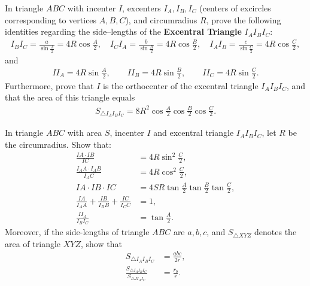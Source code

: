     \begin{question}[name={Excentral Triangle Side--Lengths}]
        In triangle $ABC$ with incenter $I$, excenters $I_A, I_B, I_C$ (centers of excircles corresponding to vertices $A,B,C$), and circumradius $R$, prove the following identities regarding the side--lengths of the \textbf{Excentral Triangle} $I_AI_BI_C$:
        \begin{align*}
            I_BI_C = \frac{a}{\displaystyle\sin\frac{A}{2}}=4R\cos\frac{A}{2}, \quad I_CI_A = \frac{b}{\displaystyle\sin\frac{B}{2}}=4R\cos\frac{B}{2}, \quad
            I_AI_B = \frac{c}{\displaystyle\sin\frac{C}{2}}=4R\cos\frac{C}{2},
        \end{align*}
        and
        \begin{align*}
            II_A = 4R\sin\frac{A}{2}, \qquad II_B = 4R\sin\frac{B}{2}, \qquad II_C = 4R\sin\frac{C}{2}.
        \end{align*}
        Furthermore, prove that $I$ is the orthocenter of the excentral triangle $I_AI_BI_C$, and that the area of this triangle equals
        \begin{align*}
            S_{\triangle I_AI_BI_C} = 8R^2\cos\frac{A}{2}\cos\frac{B}{2}\cos\frac{C}{2}.
        \end{align*}
    \end{question}


    \begin{question}[name={Excentral Identities}]
        In triangle $ABC$ with area $S$, incenter $I$ and excentral triangle $I_AI_BI_C$, let $R$ be the circumradius. Show that:
        \begin{align*}
            \frac{IA\cdot IB}{IC} &= 4R\sin^2\frac{C}{2},\\
            \frac{I_AA\cdot I_AB}{I_AC} &= 4R\cos^2\frac{C}{2},\\     IA \cdot IB \cdot IC &= 4SR\tan\frac{A}{2}\tan\frac{B}{2}\tan\frac{C}{2},\\
            \frac{IA}{I_AA}+\frac{IB}{I_BB}+\frac{IC}{I_CC}& = 1,\\
            \frac{II_A}{I_BI_C} &= \tan \frac{A}{2}.
        \end{align*}
        Moreover, if the side-lengths of triangle $ABC$ are $a,b,c$, and $S_{\triangle XYZ}$ denotes the area of triangle $XYZ$, show that
        \begin{align*}
            S_{\triangle I_AI_BI_C} &= \frac{abc}{2r},\\
            \frac{S_{\triangle I_AI_BI_C}}{S_{\triangle II_AI_C}} &= \frac{r_b}{r}.
        \end{align*}
    \end{question}

